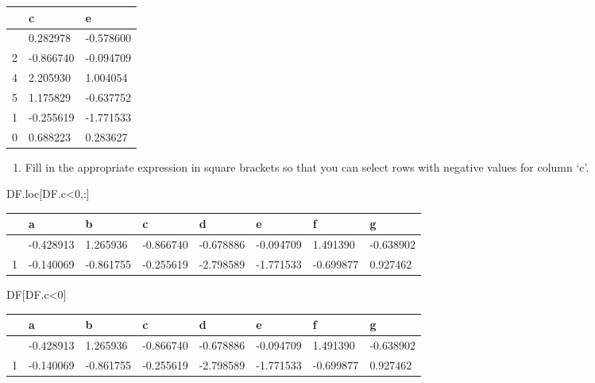 \documentclass[
  a4paper,
  DIV=11,
  numbers=noendperiod]{scrreprt}
\newenvironment{Shaded}{\begin{snugshade}}{\end{snugshade}}
\newcommand{\DecValTok}[1]{\textcolor[rgb]{0.68,0.00,0.00}{#1}}
\newcommand{\NormalTok}[1]{\textcolor[rgb]{0.00,0.23,0.31}{#1}}
\newcommand{\OperatorTok}[1]{\textcolor[rgb]{0.37,0.37,0.37}{#1}}
\providecommand{\tightlist}{%
  \setlength{\itemsep}{0pt}\setlength{\parskip}{0pt}}\usepackage{longtable,booktabs,array}
\begin{document}
\begin{longtable}[]{@{}lll@{}}
\toprule\noalign{}
& c & e \\
\midrule\noalign{}
\endhead
\bottomrule\noalign{}
\endlastfoot
3 & 0.282978 & -0.578600 \\
2 & -0.866740 & -0.094709 \\
4 & 2.205930 & 1.004054 \\
5 & 1.175829 & -0.637752 \\
1 & -0.255619 & -1.771533 \\
0 & 0.688223 & 0.283627 \\
\end{longtable}

\begin{enumerate}
\def\labelenumi{\arabic{enumi}.}
\setcounter{enumi}{4}
\tightlist
\item
  Fill in the appropriate expression in square brackets so that you can
  select rows with negative values for column `c'.
\end{enumerate}

\begin{Shaded}
\begin{Highlighting}[]
\NormalTok{DF.loc[DF.c}\OperatorTok{\textless{}}\DecValTok{0}\NormalTok{,:]}
\end{Highlighting}
\end{Shaded}

\begin{longtable}[]{@{}llllllll@{}}
\toprule\noalign{}
& a & b & c & d & e & f & g \\
\midrule\noalign{}
\endhead
\bottomrule\noalign{}
\endlastfoot
2 & -0.428913 & 1.265936 & -0.866740 & -0.678886 & -0.094709 & 1.491390
& -0.638902 \\
1 & -0.140069 & -0.861755 & -0.255619 & -2.798589 & -1.771533 &
-0.699877 & 0.927462 \\
\end{longtable}

\begin{Shaded}
\begin{Highlighting}[]
\NormalTok{DF[DF.c}\OperatorTok{\textless{}}\DecValTok{0}\NormalTok{]}
\end{Highlighting}
\end{Shaded}

\begin{longtable}[]{@{}llllllll@{}}
\toprule\noalign{}
& a & b & c & d & e & f & g \\
\midrule\noalign{}
\endhead
\bottomrule\noalign{}
\endlastfoot
2 & -0.428913 & 1.265936 & -0.866740 & -0.678886 & -0.094709 & 1.491390
& -0.638902 \\
1 & -0.140069 & -0.861755 & -0.255619 & -2.798589 & -1.771533 &
-0.699877 & 0.927462 \\
\end{longtable}
\end{document}

